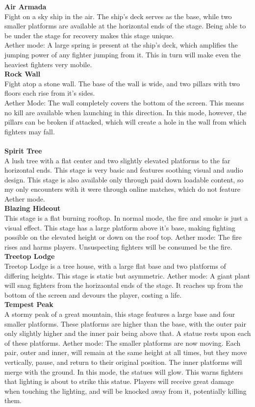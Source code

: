 \documentclass{article}
\begin{document}
\textbf{Air Armada}\\
Fight on a sky ship in the air. The ship's deck serves as the base, while two smaller platforms are available at the horizontal ends of the stage. Being able to be under the stage for recovery makes this stage unique.\\
Aether mode: A large spring is present at the ship's deck, which amplifies the jumping power of any fighter jumping from it. This in turn will make even the heaviest fighters very mobile.
\\
\textbf{Rock Wall}\\
Fight atop a stone wall. The base of the wall is wide, and two pillars with two floors each rise from it's sides.\\
Aether Mode: The wall completely covers the bottom of the screen. This means no kill are available when launching in this direction. In this mode, however, the pillars can be broken if attacked, which will create a hole in the wall from which fighters may fall.\\
\\
\textbf{Spirit Tree}\\%
A lush tree with a flat center and two slightly elevated platforms to the far horizontal ends. This stage is very basic and features soothing visual and audio design. This stage is also available only through paid down loadable content, so my only encounters with it were through online matches, which do not feature Aether mode.\\
\textbf{Blazing Hideout}\\
This stage is a flat burning rooftop. In normal mode, the fire and smoke is just a visual effect. This stage has a large platform above it's base, making fighting possible on the elevated height or down on the roof top.
Aether mode: The fire rises and harms players. Unsuspecting fighters will be consumed be the fire.
\\
\textbf{Treetop Lodge}\\
Treetop Lodge is a tree house, with a large flat base and two platforms of differing heights. This stage is static but asymmetric.
Aether mode: A giant plant will snag fighters from the horizaontal ends of the stage. It reaches up from the bottom of the screen and devours the player, costing a life.
\\
\textbf{Tempest Peak}\\
A stormy peak of a great mountain, this stage features a large base and four smaller  platforms. These platforms are higher than the base, with the outer pair only slightly higher and the inner pair being above that. A statue rests upon each of these platforms.
Aether mode: The smaller platforms are now moving. Each pair, outer and inner, will remain at the same height at all times, but they move vertically, pause, and return to their original position. The inner platforms will merge with the ground. In this mode, the statues will glow. This warns fighters that lighting is about to strike this statue. Players will receive great damage when touching the lighting, and will be knocked away from it, potentially killing them.
\\
\end{document}
